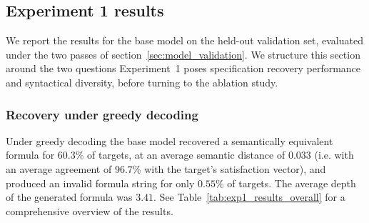 \documentclass[titlepage,a4paper,11pt]{report}
\begin{document}
    
    \subsection{Experiment 1 results}\label{sec:exp1_results}
    We report the results for the base model on the held-out validation set, evaluated under the two passes of section~\ref{sec:model_validation}. We structure this section around the two questions Experiment~1 poses specification recovery performance and syntactical diversity, before turning to the ablation study.
    
    \subsubsection{Recovery under greedy decoding}
    Under greedy decoding the base model recovered a semantically equivalent formula for $60.3\%$ of targets, at an average semantic distance of $0.033$ (i.e. with an average agreement of $96.7\%$ with the target's satisfaction vector), and produced an invalid formula string for only $0.55\%$ of targets. The average depth of the generated formula was $3.41$. See Table~\ref{tab:exp1_results_overall} for a comprehensive overview of the results.
    
\end{document}
